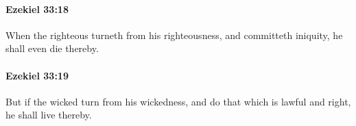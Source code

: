 		\paragraph{Ezekiel 33:18} %
			\label{EZEKIEL-33-18}

			When the righteous turneth from his righteousness, and committeth iniquity, he shall even die thereby.


		\paragraph{Ezekiel 33:19} %
			\label{EZEKIEL-33-19}

			But if the wicked turn from his wickedness, and do that which is lawful and right, he shall live thereby.


